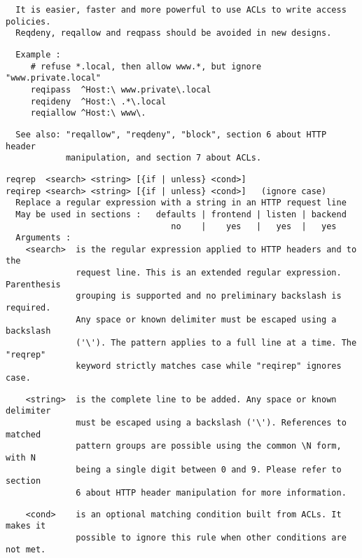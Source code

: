 \begin{verbatim}
  It is easier, faster and more powerful to use ACLs to write access policies.
  Reqdeny, reqallow and reqpass should be avoided in new designs.
\end{verbatim}

\begin{verbatim}
  Example :
     # refuse *.local, then allow www.*, but ignore "www.private.local"
     reqipass  ^Host:\ www.private\.local
     reqideny  ^Host:\ .*\.local
     reqiallow ^Host:\ www\.
\end{verbatim}

\begin{verbatim}
  See also: "reqallow", "reqdeny", "block", section 6 about HTTP header
            manipulation, and section 7 about ACLs.
\end{verbatim}

\begin{verbatim}
reqrep  <search> <string> [{if | unless} <cond>]
reqirep <search> <string> [{if | unless} <cond>]   (ignore case)
  Replace a regular expression with a string in an HTTP request line
  May be used in sections :   defaults | frontend | listen | backend
                                 no    |    yes   |   yes  |   yes
  Arguments :
    <search>  is the regular expression applied to HTTP headers and to the
              request line. This is an extended regular expression. Parenthesis
              grouping is supported and no preliminary backslash is required.
              Any space or known delimiter must be escaped using a backslash
              ('\'). The pattern applies to a full line at a time. The "reqrep"
              keyword strictly matches case while "reqirep" ignores case.
\end{verbatim}

\begin{verbatim}
    <string>  is the complete line to be added. Any space or known delimiter
              must be escaped using a backslash ('\'). References to matched
              pattern groups are possible using the common \N form, with N
              being a single digit between 0 and 9. Please refer to section
              6 about HTTP header manipulation for more information.
\end{verbatim}

\begin{verbatim}
    <cond>    is an optional matching condition built from ACLs. It makes it
              possible to ignore this rule when other conditions are not met.
\end{verbatim}

